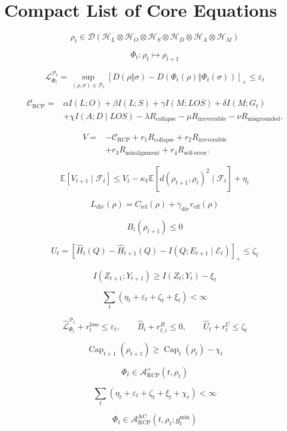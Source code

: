 \documentclass[11pt]{article}
\newcommand{\D}{\mathcal{D}}
\newcommand{\Hcal}{\mathcal{H}}
\newcommand{\Acal}{\mathcal{A}}
\newcommand{\Pcal}{\mathcal{P}}
\newcommand{\Ecal}{\mathcal{E}}
\newcommand{\Fcal}{\mathcal{F}}
\newcommand{\Ccal}{\mathcal{C}}
\newcommand{\Lcal}{\mathcal{L}}
\newcommand{\1}{\mathbf{1}}
\newcommand{\eps}{\varepsilon}
\newcommand{\RCP}{\mathrm{RCP}}
\newcommand{\diver}{\mathrm{div}}
\newcommand{\loss}{\mathrm{loss}}
\newcommand{\rel}{\mathrm{rel}}
\renewcommand{\Cap}{\operatorname{Cap}}
\providecommand{\AC}{\mathrm{AC}}
\begin{document}
\appendix

\section{Compact List of Core Equations}

\[
\rho_t\in\D(\Hcal_L\otimes\Hcal_O\otimes\Hcal_S\otimes\Hcal_D\otimes\Hcal_A\otimes\Hcal_M)
\]

\[
\Phi_t:\rho_t\mapsto\rho_{t+1}
\]

\[
\Lcal^{\Pcal_t}_{\Phi_t}
=
\sup_{(\rho,\sigma)\in\Pcal_t}
\left[
D(\rho\Vert\sigma)-D(\Phi_t(\rho)\Vert\Phi_t(\sigma))
\right]_+
\le\eps_t
\]

\[
\begin{aligned}
\Ccal_{\RCP}
={}&\alpha I(L;O)+\beta I(L;S)+\gamma I(M;LOS)+\delta I(M;G_t)\\
&+\chi I(A;D\mid LOS)-\lambda R_{\mathrm{collapse}}
-\mu R_{\mathrm{irreversible}}-\nu R_{\mathrm{misgrounded}}.
\end{aligned}
\]

\[
\begin{aligned}
V={}&-\Ccal_{\RCP}+r_1R_{\mathrm{collapse}}+r_2R_{\mathrm{irreversible}}\\
&+r_3R_{\mathrm{misalignment}}+r_4R_{\mathrm{self\mbox{-}error}}.
\end{aligned}
\]

\[
\mathbb E[V_{t+1}\mid\Fcal_t]
\le
V_t-
\kappa_V\mathbb E[d(\rho_{t+1},\rho_t)^2\mid\Fcal_t]+
\eta_t
\]

\[
L_{\diver}(\rho)=C_{\rel}(\rho)+\gamma_{\diver}r_{\mathrm{eff}}(\rho)
\]

\[
B_i(\rho_{t+1})\le0
\]

\[
U_t=[\widehat H_t(Q)-\widehat H_{t+1}(Q)-I(Q;E_{t+1}\mid\Ecal_t)]_+\le\zeta_t
\]

\[
I(Z_{t+1};Y_{t+1})\ge I(Z_t;Y_t)-\xi_t
\]

\[
\sum_t(\eta_t+\eps_t+\zeta_t+\xi_t)<\infty
\]

\[
\widehat{\Lcal}^{\Pcal_t}_{\Phi_t}+r_t^{\loss}\le\eps_t,
\qquad
\widehat B_i+r^B_{t,i}\le0,
\qquad
\widehat U_t+r^U_t\le\zeta_t
\]

\[
\Cap_{t+1}(\rho_{t+1})
\ge
\Cap_t(\rho_t)-\chi_t
\]

\[
\Phi_t\in\Acal_{\RCP}^{+}(t,\rho_t)
\]

\[
\sum_t(\eta_t+\eps_t+\zeta_t+\xi_t+\chi_t)<\infty
\]


\[
\Phi_t\in\Acal_{\RCP}^{\AC}(t,\rho_t;g_t^{\min})
\]
\end{document}
